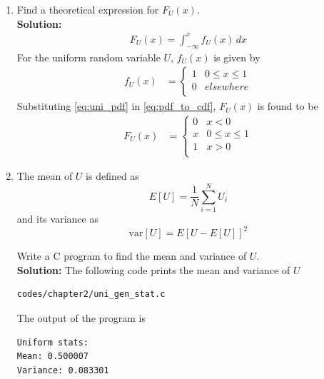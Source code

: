 \documentclass[journal,10pt,twocolumn]{IEEEtran}
\providecommand{\sbrak}[1]{\ensuremath{{}\left[#1\right]}}
\newcommand{\solution}{\noindent \textbf{Solution: }}
\begin{document}
\begin{enumerate}
%
\item
Find a  theoretical expression for $F_{U}(x)$.\\
\solution
\begin{align} 
F_{U}(x) = \int_{-\infty}^{x} f_{U}(x)\,dx
\label{eq:pdf_to_cdf}
\end{align}
For the uniform random variable $U$, $f_{U}(x)$ is given by  
\begin{align}
	f_U(x) &= 
	\begin{cases}
	1 &  0 \le x \le  1
	\\
	0 & elsewhere
	\\
	\end{cases}
	\label{eq:uni_pdf}
\end{align}
Substituting \eqref{eq:uni_pdf} in \eqref{eq:pdf_to_cdf}, $F_U(x)$ is found to be
\begin{align}
	F_U(x) &= 
	\begin{cases}
	0 & x < 0
	\\	
	x & 0 \le x \le  1
	\\
	1 & x > 0
	\\
	\end{cases}
	\label{eq:uni_cdf}
\end{align}

\item
\label{prob:print_uni}
The mean of $U$ is defined as
%
\begin{equation}
E\sbrak{U} = \frac{1}{N}\sum_{i=1}^{N}U_i
\end{equation}
%
and its variance as
%
\begin{equation}
\text{var}\sbrak{U} = E\sbrak{U- E\sbrak{U}}^2 
\end{equation}

Write a C program to  find the mean and variance of $U$.\\
\solution The following code prints the mean and variance of $U$
\begin{lstlisting}
codes/chapter2/uni_gen_stat.c
\end{lstlisting}
The output of the program is
\begin{lstlisting}
Uniform stats:
Mean: 0.500007
Variance: 0.083301
\end{lstlisting}


\end{enumerate}
\end{document}
